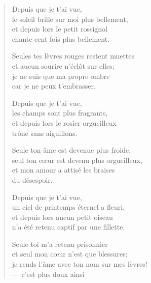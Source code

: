 \documentclass[11pt]{extbook}
\newcommand*{\centeredornament}{\centerline{\pgfornament[width=6cm]{88}}}
\begin{document}
\begin{verse}
  Depuis que je t'ai vue, \\
  le soleil brille sur moi plus bellement, \\
  et depuis lors le petit rossignol \\
  chante cent fois plus bellement.

  Seules tes lèvres rouges restent muettes \\
  et aucun sourire n'éclôt sur elles; \\
  je ne suis que ma propre ombre \\
  car je ne peux t'embrasser.

  Depuis que je t'ai vue, \\
  les champs sont plus fragrants, \\
  et depuis lors le rosier orgueilleux \\
  trône sans aiguillons.

  Seule ton âme est devenue plus froide, \\
  seul ton cœur est devenu plus orgueilleux, \\
  et mon amour a attisé les braises \\
  du désespoir.

  Depuis que je t'ai vue, \\
  un ciel de printemps éternel a fleuri, \\
  et depuis lors aucun petit oiseau \\
  n'a été retenu captif par une fillette.

  Seule toi m'a retenu prisonnier \\
  et seul mon cœur n'est que blessures; \\
  je rends l'âme avec ton nom sur mes lèvres! \\
  --- c'est plus doux ainsi
\end{verse}

\newpage

\vspace*{-15mm}
\centeredornament


\end{document}
